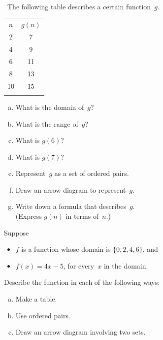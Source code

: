 \begin{exercise}{23} \ 
 The following table describes a certain function~$g$.
\begin{center}
\begin{tabular}{|c|c|}
\noalign{\hrule}
$n$ & $g(n)$ \\
\noalign{\hrule}
2 & 7 \\
 4 & 9 \\
 6  & 11 \\
 8 & 13 \\
 10 & 15 \\
\noalign{\hrule}
\end{tabular}
\end{center}
\begin{enumerate}[(a)]
\item   \label{FunctionsChapExers-gTable-domain}
What is the domain of~$g$?
\item   \label{FunctionsChapExers-gTable-range}
What is the range of~$g$?
\item  \label{FunctionsChapExers-gTable-g(6)}
What is $g(6)$?
\item  \label{FunctionsChapExers-gTable-g(7)}
What is $g(7)$?
\item  \label{FunctionsChapExers-gTable-pairs}
Represent~$g$ as a set of ordered pairs.
\item  \label{FunctionsChapExers-gTable-arrow}
Draw an arrow diagram to represent~$g$.
\item  \label{FunctionsChapExers-gTable-formula}
Write down a formula that describes~$g$. 
\\(Express
$g(n)$ in terms of~$n$.)
\end{enumerate}
\end{exercise}

\begin{exercise}{}
 Suppose 
\begin{itemize}
\item $f$ is a function whose domain is $\{0,2,4,6\}$, 
and 
\item $f(x) = 4x - 5$, for every~$x$ in the domain. 
\end{itemize}
Describe the function in each of the following ways:
 \begin{enumerate}[(a)]
\item  \label{FunctionsChapExers-fFormula-table}
Make a table.
\item  \label{FunctionsChapExers-fFormula-pairs}
Use ordered pairs.
\item  \label{FunctionsChapExers-fFormula-arrow}
Draw an arrow diagram involving two sets.
\end{enumerate}
\end{exercise}

